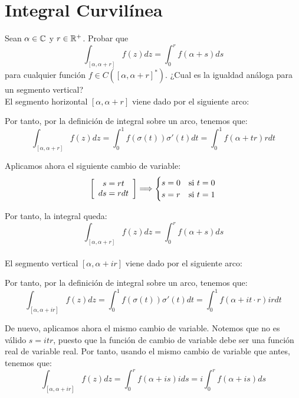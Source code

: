 \section{Integral Curvilínea}

\begin{ejercicio}
    Sean $\alpha \in \mathbb{C}$ y $r \in \mathbb{R}^+$. Probar que
    \[
        \int_{[\alpha,\alpha+r]} f(z)dz = \int_{0}^{r} f(\alpha+s)ds
    \]
    para cualquier función $f \in C\left([\alpha,\alpha+r]^*\right)$.
    ¿Cual es la igualdad análoga para un segmento vertical?\\

    El segmento horizontal $[\alpha,\alpha+r]$ viene dado por el siguiente arco:

    Por tanto, por la definición de integral sobre un arco, tenemos que:
    \[
        \int_{[\alpha,\alpha+r]} f(z)dz = \int_{0}^{1} f(\sigma(t))\sigma'(t)dt = \int_{0}^{1} f(\alpha + tr)r dt
    \]

    Aplicamos ahora el siguiente cambio de variable:
    \begin{equation*}
        \left[\begin{array}{c} s=rt \\ ds=rdt \end{array}\right]\Longrightarrow \begin{cases}
            s=0 & \text{si } t=0 \\
            s=r & \text{si } t=1
        \end{cases}
    \end{equation*}

    Por tanto, la integral queda:
    \begin{equation*}
        \int_{[\alpha,\alpha+r]} f(z)dz = \int_{0}^{r} f(\alpha+s)ds
    \end{equation*}~\\

    El segmento vertical $[\alpha,\alpha+ir]$ viene dado por el siguiente arco:

    Por tanto, por la definición de integral sobre un arco, tenemos que:
    \[
        \int_{[\alpha,\alpha+ir]} f(z)dz = \int_{0}^{1} f(\sigma(t))\sigma'(t)dt = \int_{0}^{1} f(\alpha + it\cdot r)ir dt
    \]

    De nuevo, aplicamos ahora el mismo cambio de variable. Notemos que no es válido $s=itr$, puesto que la función de cambio de variable debe ser una función real de variable real. Por tanto, usando el mismo cambio de variable que antes, tenemos que:
    \begin{equation*}
        \int_{[\alpha,\alpha+ir]} f(z)dz = \int_{0}^{r} f(\alpha+is)ids
        = i\int_{0}^{r} f(\alpha+is)ds
    \end{equation*}
\end{ejercicio}

